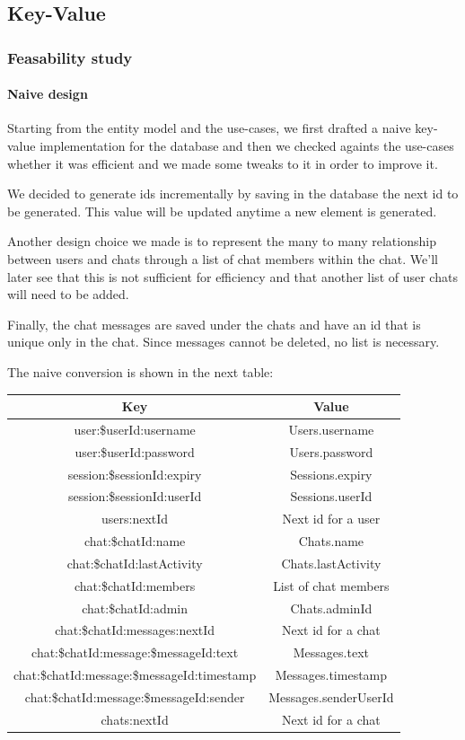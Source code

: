 \documentclass[10pt]{article}
\begin{document}
\subsection{Key-Value}
\subsubsection{Feasability study}
\paragraph{Naive design}
Starting from the entity model and the use-cases, we first drafted a naive key-value 
implementation for the database and then we checked againts the use-cases whether 
it was efficient and we made some tweaks to it in order to improve it. 

We decided to generate ids incrementally by saving in the database the next id
to be generated. This value will be updated anytime a new element is generated.

Another design choice we made is to represent the many to many relationship 
between users and chats through a list of chat members within the chat. We'll
later see that this is not sufficient for efficiency and that another list of 
user chats will need to be added.

Finally, the chat messages are saved under the chats and have an id that is 
unique only in the chat. Since messages cannot be deleted, no list is necessary.

The naive conversion is shown in the next table:

\begin{center}
\begin{tabular}{ | c | c | }
    \hline
    \textbf{Key} & \textbf{Value} \\\hline
    user:\$userId:username & Users.username \\\hline
    user:\$userId:password & Users.password \\\hline
    session:\$sessionId:expiry & Sessions.expiry \\\hline
    session:\$sessionId:userId & Sessions.userId \\\hline
    users:nextId & Next id for a user \\\hline
    chat:\$chatId:name & Chats.name \\\hline
    chat:\$chatId:lastActivity & Chats.lastActivity \\\hline
    chat:\$chatId:members & List of chat members \\\hline
    chat:\$chatId:admin & Chats.adminId\\\hline
    chat:\$chatId:messages:nextId & Next id for a chat \\\hline
    chat:\$chatId:message:\$messageId:text & Messages.text \\\hline
    chat:\$chatId:message:\$messageId:timestamp & Messages.timestamp \\\hline
    chat:\$chatId:message:\$messageId:sender & Messages.senderUserId \\\hline
    chats:nextId & Next id for a chat \\\hline
\end{tabular}
\end{center}
\end{document}
